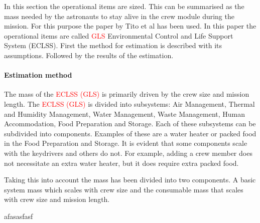 In this section the operational items are sized. This can be summarised as the mass needed by the astronauts to stay alive in the crew module during the mission. For this purpose the paper by Tito et al \cite{Tito2013} has been used. In this paper the operational items are called \textcolor{red}{GLS} Environmental Control and Life Support System (ECLSS). First the method for estimation is described with its assumptions. Followed by the results of the estimation.

\paragraph{Estimation method}
\label{par:operationalest}
The mass of the \textcolor{red}{ECLSS (GLS)} is primarily driven by the crew size and mission length. The \textcolor{red}{ECLSS (GLS)} is divided into subsystems: Air Management, Thermal and Humidity Management, Water Management, Waste Management, Human Accommodation, Food Preparation and Storage. Each of these subsystems can be subdivided into components. Examples of these are a water heater or packed food in the Food Preparation and Storage. It is evident that some components scale with the keydrivers and others do not. For example, adding a crew member does not necessitate an extra water heater, but it does require extra packed food. 


Taking this into account the mass has been divided into two components. A basic system mass which scales with crew size and the consumable mass that scales with crew size and mission length.





afasasfasf
